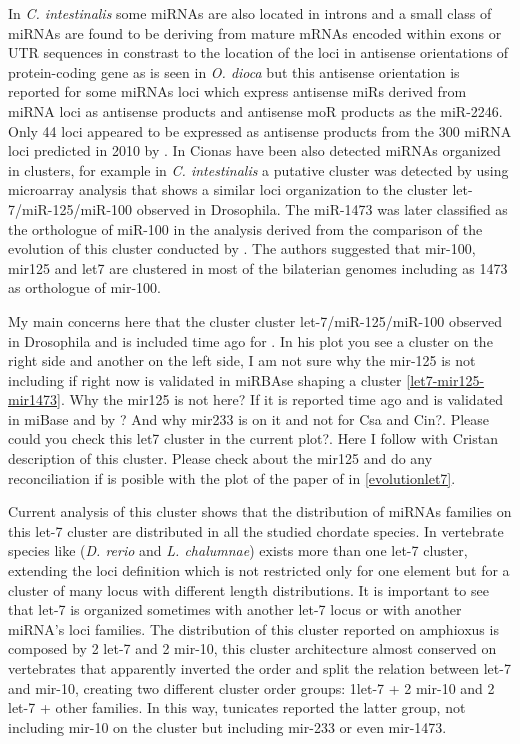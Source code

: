 \documentclass[11pt]{article}
\newcommand{\CAVH}[1]{\begingroup\color{red}#1\endgroup}
\begin{document}
In \textit{C. intestinalis} some miRNAs are also located in introns and a small class of miRNAs are found to be deriving from mature mRNAs encoded within exons or UTR sequences \cite{Hendrix2010} in constrast to the location of the  loci in antisense orientations of protein-coding gene as is seen in \textit{O. dioca} but this antisense orientation is reported for some miRNAs loci which express antisense miRs derived from miRNA loci as antisense products and antisense moR products as the miR-2246. Only 44 loci appeared to be expressed as antisense products from the 300 miRNA loci predicted in 2010 by \cite{Hendrix2010}. In Cionas have been also detected miRNAs organized in clusters, for example in  \textit{C. intestinalis} a putative cluster was detected by \cite{Keshavan2010} using microarray analysis that shows a similar loci organization to the cluster let-7/miR-125/miR-100 observed in Drosophila. The miR-1473 was later classified as the orthologue of miR-100 in the analysis derived from the comparison of the evolution of this cluster conducted by \cite{Griffiths-Jones2011}. The authors suggested that mir-100, mir125 and let7 are clustered in most of the bilaterian genomes including as 1473 as orthologue of mir-100. 

\CAVH{My main concerns here that the cluster cluster let-7/miR-125/miR-100 observed in Drosophila and is included time ago for \cite{Griffiths-Jones2011}. In his plot you see a cluster on the right side and another on the left side, I am not sure why the mir-125 is not including if right now is validated in miRBAse shaping a cluster \ref{let7-mir125-mir1473}. Why the mir125 is not here? If it is reported time ago and is validated in miBase and by \cite{Keshavan2010}? And why mir233 is on it and not for Csa and Cin?. Please could you check this let7 cluster in the current plot?. Here I follow with Cristan description of this cluster. Please check about the mir125 and do any reconciliation if is posible with the plot of the paper of  \cite{Griffiths-Jones2011} in \ref{evolutionlet7}. 


Current analysis of this cluster shows that the distribution of miRNAs families on this let-7 cluster are distributed in all the studied chordate species. In vertebrate species like (\textit{D. rerio} and \textit{L. chalumnae}) exists more than one let-7 cluster, extending the loci definition which is not restricted only for one element but for a cluster of many locus with different length distributions. It is important to see that let-7 is organized sometimes with another let-7 locus or with another miRNA's loci families. The distribution of this cluster reported on amphioxus is composed by 2 let-7 and 2 mir-10, this cluster architecture almost conserved on vertebrates that apparently inverted the order and split the relation between let-7 and mir-10, creating two different cluster order groups: 1let-7 + 2 mir-10 and 2 let-7 + other families. In this way, tunicates reported the latter group, not including mir-10 on the cluster but including mir-233 or even mir-1473.} 
\end{document}
